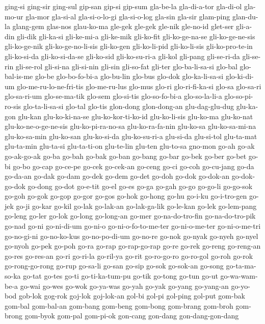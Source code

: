 {ging-si ging-sir ging-sul gip-san gip-si gip-sum gla-be-la gla-di-a-tor
gla-di-ol gla-mo-ur gla-mor gla-si-al gla-si-o-lo-gi gla-si-o-log gla-sin
gla-sir glam-ping glan-du-la glang-gem glas-nos glau-ko-ma gle-gek gle-gek
gle-nik gle-no-id glet-ser gli-a-din gli-dik gli-ka-si gli-ke-mi-a
gli-ke-mik gli-ko-fit gli-ko-ge-na-se gli-ko-ge-ne-sis gli-ko-ge-nik
gli-ko-ge-no-li-sis gli-ko-gen gli-ko-li-pid gli-ko-li-sis
gli-ko-pro-te-in gli-ko-si-da gli-ko-si-da-se gli-ko-sid gli-ko-su-ri-a
gli-kol gli-pang gli-se-ri-da gli-se-rin gli-se-rol gli-si-na gli-si-nin
gli-sin gli-so-fat gli-ter glo-ba-li-sa-si glo-bal glo-bal-is-me glo-be
glo-bo-fo-bi-a glo-bu-lin glo-bus glo-dok glo-ka-li-sa-si glo-ki-di-um
glo-me-ru-lo-ne-fri-tis glo-me-ru-lus glo-mus glo-ri glo-ri-fi-ka-si
glo-sa glo-sa-ri glo-sa-ri-um glo-se-ma-tik glo-sem glo-si-tis
glo-so-fo-bi-a glo-so-la-li-a glo-so-pi-ro-sis glo-ta-li-sa-si glo-tal
glo-tis glon-dong glon-dong-an glu-dag-glu-dug glu-ka-gon glu-kan
glu-ko-ki-na-se glu-ko-kor-ti-ko-id glu-ko-li-sis glu-ko-ma glu-ko-nat
glu-ko-ne-o-ge-ne-sis glu-ko-pi-ra-no-sa glu-ko-ra-fa-nin glu-ko-sa
glu-ko-sa-mi-na glu-ko-sa-min glu-ko-san glu-ko-si-da glu-ko-su-ri-a
glu-si-da glu-si-tol glu-ta-mat glu-ta-min glu-ta-si glu-ta-ti-on
glu-te-lin glu-ten glu-to-sa gno-mon go-ah go-ak go-ak-go-ak go-ba go-bah
go-bak go-ban go-bang go-bar go-bek go-ber go-bet go-bi go-bo go-cap
go-ce-pe go-cek go-cek-an go-ceng go-ci go-coh go-cu-jang go-da go-da-an
go-dak go-dam go-dek go-dem go-det go-doh go-dok go-dok-an go-dok-go-dok
go-dong go-dot go-e-tit go-el go-es go-ga go-gah go-go go-go-li go-go-sok
go-goh go-gok go-gop go-gor go-gos go-hok go-hong go-hu go-i-ku
go-i-tro-gen go-jek go-ji go-kar go-kil go-lak go-lak-an go-lak-ga-lik
go-le-kan go-lek go-lem-pang go-leng go-ler go-lok go-long go-long-an
go-mer go-na-do-tro-fin go-na-do-tro-pik go-nad go-ni go-ni-di-um go-ni-o
go-ni-o-fo-to-me-ter go-ni-o-me-ter go-ni-o-me-tri go-no-gi-ni
go-no-ko-kus go-no-po-di-um go-no-re go-nok go-nyak go-nyeh go-nyel
go-nyoh go-pek go-poh go-ra go-rap go-rap-go-rap go-re go-rek go-reng
go-reng-an go-res go-res-an go-ri go-ri-la go-ril-ya go-rit go-ro-go-ro
go-ro-gol go-roh go-rok go-rong-go-rong go-rup go-sa-li go-san go-sip
go-sok go-sok-an go-song go-ta-ma-so-ka go-tat go-tes go-ti
go-ti-ka-tum-pu go-tik go-tong go-tun go-ut go-wa-wam-be-a go-wai go-wes
go-wok go-ya-was go-yah go-yak go-yang go-yang-an go-yo-bod gob-lok
gog-rok goj-lok goj-lok-an gol-bi gol-pi gol-ping gol-put gom-bak gom-bal
gom-bal-an gom-bang gom-beng gom-bong gom-brang gom-broh gom-brong
gom-byok gom-pal gom-pi-ok gon-cang gon-dang gon-dang-gon-dang
}
